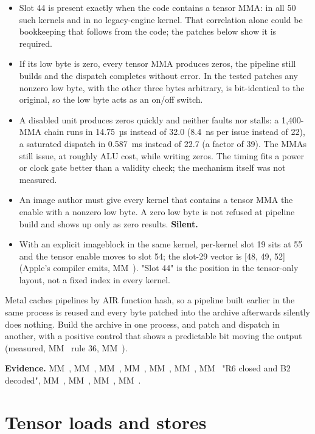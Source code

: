 \begin{itemize}
\item Slot 44 is present exactly when the code contains a tensor MMA: in all 50 such kernels and in no legacy-engine
  kernel. That correlation alone could be bookkeeping that follows from the code; the patches below show it is required.
\item If its low byte is zero, every tensor MMA produces zeros, the pipeline still builds and the dispatch completes
  without error. In the tested patches any nonzero low byte, with the other three bytes arbitrary, is bit-identical
  to the original, so the low byte acts as an on/off switch.
\item A disabled unit produces zeros quickly and neither faults nor stalls: a 1,400-MMA chain runs in 14.75~µs
  instead of 32.0 (8.4~ns per issue instead of 22), a saturated dispatch in 0.587~ms instead of 22.7 (a factor of 39).
  The MMAs still issue, at roughly ALU cost, while writing zeros. The timing fits a power or clock gate better than a
  validity check; the mechanism itself was not measured.
\item An image author must give every kernel that contains a tensor MMA the enable with a nonzero low byte. A zero low byte is not refused at pipeline build and shows up only as zero results.
  \textbf{Silent.}
\item With an explicit imageblock in the same kernel, per-kernel slot 19 sits at 55 and the tensor enable moves to slot 54;
  the slot-29 vector is {[}48, 49, 52{]} (Apple's compiler emits, MM~). "Slot 44" is the position in the
  tensor-only layout, not a fixed index in every kernel.
\end{itemize}

Metal caches pipelines by AIR function hash, so a pipeline built earlier in the same process is
reused and every byte patched into the archive afterwards silently does nothing. Build the archive in one process, and
patch and dispatch in another, with a positive control that shows a predictable bit moving the output (measured,
MM~ rule 36, MM~).

\textbf{Evidence.} MM~, MM~, MM~, MM~, MM~, MM~, MM~ "R6 closed and B2 decoded", MM~, MM~,
MM~, MM~.

\section{Tensor loads and stores}\label{sec:tensor-memory-path}


